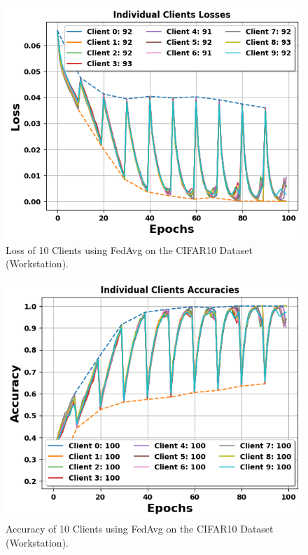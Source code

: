 \documentclass[conference]{IEEEtran}
\begin{document}
%
\begin{figure}[htp!]
	\centering
	\includegraphics[scale=.51]{Images/NEWGRAPHS/loss_fedavg.png }
	\caption{Loss of 10 Clients using FedAvg on the CIFAR10 Dataset (Workstation).}
	\label{lossFedAvgC10}
\end{figure}

\begin{figure}[htp!]
	\centering
	\includegraphics[scale=.51]{Images/NEWGRAPHS/acc_fedavg.png }
	\caption{Accuracy of 10 Clients using FedAvg on the CIFAR10 Dataset (Workstation).}
	\label{accFedAvgC10}
\end{figure}
\end{document}
